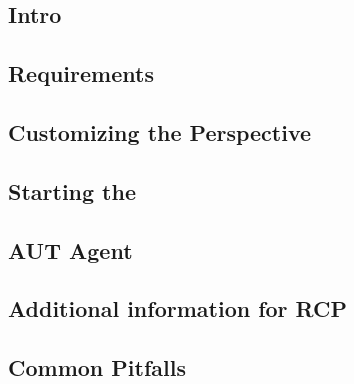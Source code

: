 \subsection{Intro}
\label{LaunchConfigurationsIntro}


\subsection{Requirements}
\label{LaunchConfigurationsRequirements}


\subsection{Customizing the Perspective}
\label{LaunchConfigurationsCustomizePerspective}


\subsection{Starting the \gdaut{}}
\label{LaunchConfigurationsLaunch}


\subsection{AUT Agent}
\label{LaunchConfigurationsAutAgent}


\subsection{Additional information for RCP \gdauts{}}
\label{LaunchConfigurationsRcp}


\subsection{Common Pitfalls}
\label{LaunchConfigurationsPitfalls}

